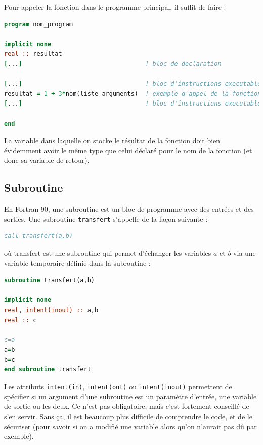 \documentclass[a4paper,twoside]{article}
\begin{document}
Pour appeler la fonction dans le programme principal, il suffit de faire :
\begin{lstlisting}[language=Fortran]
program nom_program 

implicit none 
real :: resultat
[...]                                  ! bloc de declaration 

[...]                                  ! bloc d'instructions executables 
resultat = 1 + 3*nom(liste_arguments)  ! exemple d'appel de la fonction nom 
[...]                                  ! bloc d'instructions executables 

end 
\end{lstlisting}

\begin{remarque}
La variable dans laquelle on stocke le résultat de la fonction doit bien évidemment avoir le même type que celui déclaré pour le nom de la fonction (et donc sa variable de retour).
\end{remarque}

\subsection{Subroutine}
En Fortran 90, une subroutine est un bloc de programme avec des entrées et des sorties. Une subroutine \texttt{transfert} s'appelle de la façon suivante : 
\begin{lstlisting}[language=Fortran]
call transfert(a,b)
\end{lstlisting}

où transfert est une subroutine qui permet d'échanger les variables $a$ et $b$ via une variable temporaire définie dans la subroutine : 
\begin{lstlisting}[language=Fortran]
subroutine transfert(a,b)

implicit none
real, intent(inout) :: a,b
real :: c

c=a
a=b
b=c
end subroutine transfert
\end{lstlisting}

Les attributs \texttt{intent(in)}, \texttt{intent(out)} ou \texttt{intent(inout)} permettent de spécifier si un argument d'une subroutine est un paramètre d'entrée, une variable de sortie ou les deux. Ce n'est pas obligatoire, mais c'est fortement conseillé de s'en servir. Sans ça, il est beaucoup plus difficile de comprendre le code, et de le sécuriser (pour savoir si on a modifié une variable alors qu'on n'aurait pas dû par exemple).
\end{document}
